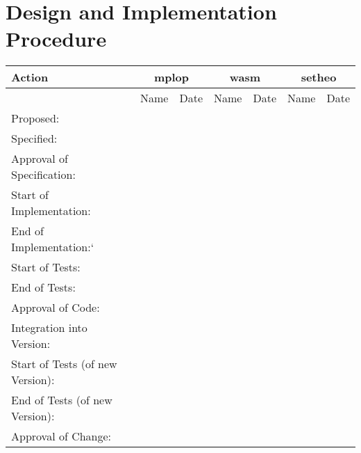 \section{Design and Implementation Procedure}

\begin{center}
\begin{tabular}{|l||c|c||c|c||c|c||}
\hline\hline
Action & \multicolumn{2}{|c|}{mplop} &
\multicolumn{2}{|c|}{wasm} & \multicolumn{2}{|c|}{setheo}  \\
\hline
& Name & Date & Name & Date & Name & Date \\
\hline\hline
 Proposed:& & & & & & \\
 Specified:& & & & & & \\
 Approval of Specification:& & & & & & \\
 Start of Implementation:& & & & & & \\
 End of Implementation:`& & & & & & \\
 Start of Tests:& & & & & & \\
 End of Tests:& & & & & & \\
 Approval of Code:& & & & & & \\
 Integration into Version: & & & & & & \\
 Start of Tests (of new Version):& & & & & & \\
 End of Tests (of new Version):& & & & & & \\
 Approval of Change:& & & & & & \\
\hline\hline
\end{tabular}
\end{center}


